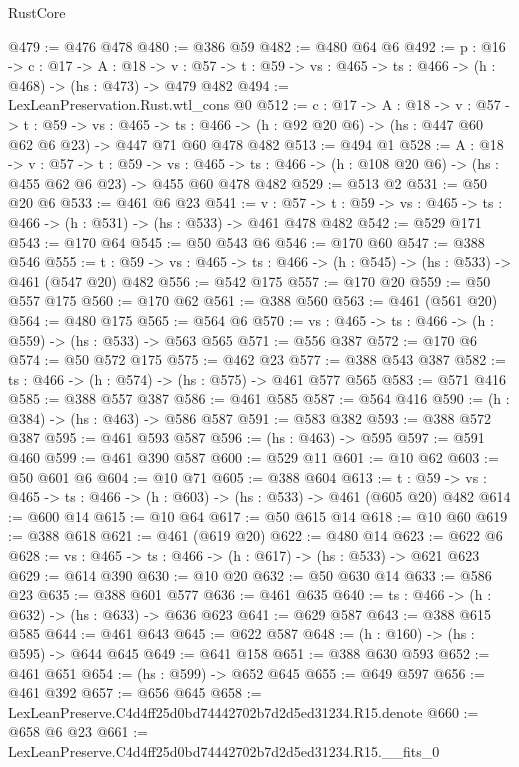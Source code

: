 \begin{lexlean}{RustCore}
\begin{coremodule}
@479 := @476 @478
@480 := @386 @59
@482 := @480 @64 @6
@492 := {p : @16} ->
  {c : @17} ->
  {A : @18} ->
  {v : @57} -> {t : @59} -> {vs : @465} -> {ts : @466} -> (h : @468) -> (hs : @473) -> @479 @482
@494 := LexLeanPreservation.Rust.wtl_cons @0
@512 := {c : @17} ->
  {A : @18} ->
  {v : @57} ->
  {t : @59} ->
  {vs : @465} ->
  {ts : @466} -> (h : @92 @20 @6) -> (hs : @447 @60 @62 @6 @23) -> @447 @71 @60 @478 @482
@513 := @494 @1
@528 := {A : @18} ->
  {v : @57} ->
  {t : @59} ->
  {vs : @465} -> {ts : @466} -> (h : @108 @20 @6) -> (hs : @455 @62 @6 @23) -> @455 @60 @478 @482
@529 := @513 @2
@531 := @50 @20 @6
@533 := @461 @6 @23
@541 := {v : @57} ->
  {t : @59} -> {vs : @465} -> {ts : @466} -> (h : @531) -> (hs : @533) -> @461 @478 @482
@542 := @529 @171
@543 := @170 @64
@545 := @50 @543 @6
@546 := @170 @60
@547 := @388 @546
@555 := {t : @59} -> {vs : @465} -> {ts : @466} -> (h : @545) -> (hs : @533) -> @461 (@547 @20) @482
@556 := @542 @175
@557 := @170 @20
@559 := @50 @557 @175
@560 := @170 @62
@561 := @388 @560
@563 := @461 (@561 @20)
@564 := @480 @175
@565 := @564 @6
@570 := {vs : @465} -> {ts : @466} -> (h : @559) -> (hs : @533) -> @563 @565
@571 := @556 @387
@572 := @170 @6
@574 := @50 @572 @175
@575 := @462 @23
@577 := @388 @543 @387
@582 := {ts : @466} -> (h : @574) -> (hs : @575) -> @461 @577 @565
@583 := @571 @416
@585 := @388 @557 @387
@586 := @461 @585
@587 := @564 @416
@590 := (h : @384) -> (hs : @463) -> @586 @587
@591 := @583 @382
@593 := @388 @572 @387
@595 := @461 @593 @587
@596 := (hs : @463) -> @595
@597 := @591 @460
@599 := @461 @390 @587
@600 := @529 @11
@601 := @10 @62
@603 := @50 @601 @6
@604 := @10 @71
@605 := @388 @604
@613 := {t : @59} -> {vs : @465} -> {ts : @466} -> (h : @603) -> (hs : @533) -> @461 (@605 @20) @482
@614 := @600 @14
@615 := @10 @64
@617 := @50 @615 @14
@618 := @10 @60
@619 := @388 @618
@621 := @461 (@619 @20)
@622 := @480 @14
@623 := @622 @6
@628 := {vs : @465} -> {ts : @466} -> (h : @617) -> (hs : @533) -> @621 @623
@629 := @614 @390
@630 := @10 @20
@632 := @50 @630 @14
@633 := @586 @23
@635 := @388 @601 @577
@636 := @461 @635
@640 := {ts : @466} -> (h : @632) -> (hs : @633) -> @636 @623
@641 := @629 @587
@643 := @388 @615 @585
@644 := @461 @643
@645 := @622 @587
@648 := (h : @160) -> (hs : @595) -> @644 @645
@649 := @641 @158
@651 := @388 @630 @593
@652 := @461 @651
@654 := (hs : @599) -> @652 @645
@655 := @649 @597
@656 := @461 @392
@657 := @656 @645
@658 := LexLeanPreserve.C4d4ff25d0bd74442702b7d2d5ed31234.R15.denote
@660 := @658 @6 @23
@661 := LexLeanPreserve.C4d4ff25d0bd74442702b7d2d5ed31234.R15.__fits_0

\end{coremodule}
\end{lexlean}
